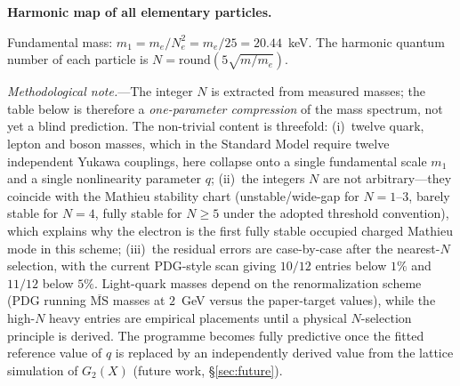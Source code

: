 \documentclass[11pt]{article}
\begin{document}
\medskip
\textbf{Harmonic map of all elementary particles.}

Fundamental mass: $m_1 = m_e/N_e^2
= m_e/25 = 20.44$~keV.
The harmonic quantum number of each particle is
$N = \mathrm{round}(5\sqrt{m/m_e})$.

\textit{Methodological note.}---The integer $N$
is extracted from measured masses; the table
below is therefore a \emph{one-parameter
compression} of the mass spectrum, not yet a
blind prediction.  The non-trivial content is
threefold: (i)~twelve quark, lepton and boson
masses, which in the Standard Model require
twelve independent Yukawa couplings, here
collapse onto a single fundamental scale $m_1$
and a single nonlinearity parameter $q$;
(ii)~the integers $N$ are not arbitrary---they
coincide with the Mathieu stability chart
(unstable/wide-gap for $N = 1$--$3$, barely stable for
$N = 4$, fully stable for $N \ge 5$ under the adopted
threshold convention), which explains why the electron is
the first fully stable occupied charged Mathieu mode in this
scheme;
(iii)~the residual errors are case-by-case after the
nearest-$N$ selection, with the current PDG-style scan giving
$10/12$ entries below $1\%$ and $11/12$ below $5\%$.
Light-quark masses depend on the renormalization scheme
(PDG running $\overline{\mathrm{MS}}$ masses at $2$~GeV
versus the paper-target values), while the high-$N$ heavy
entries are empirical placements until a physical
$N$-selection principle is derived.
The programme becomes fully predictive once the fitted
reference value of $q$ is replaced by an independently
derived value from the lattice simulation of $G_2(X)$
(future work, \S\ref{sec:future}).
\end{document}
